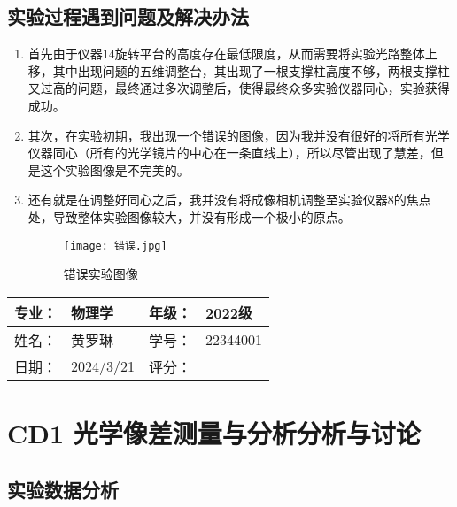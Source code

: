 \documentclass[dvipsnames, svgnames,a4paper,11pt]{article}
\begin{document}
	
	\subsection{实验过程遇到问题及解决办法}
	\begin{enumerate}
		\item 首先由于仪器14旋转平台的高度存在最低限度，从而需要将实验光路整体上移，其中出现问题的五维调整台，其出现了一根支撑柱高度不够，两根支撑柱又过高的问题，最终通过多次调整后，使得最终众多实验仪器同心，实验获得成功。
		\item 其次，在实验初期，我出现一个错误的图像，因为我并没有很好的将所有光学仪器同心（所有的光学镜片的中心在一条直线上），所以尽管出现了慧差，但是这个实验图像是不完美的。
		\item 还有就是在调整好同心之后，我并没有将成像相机调整至实验仪器8的焦点处，导致整体实验图像较大，并没有形成一个极小的原点。
		
		
		
		\begin{figure}[H]
		\centering
		\texttt{[image: 错误.jpg]}
		\caption{错误实验图像}
		\label{错误实验图像}
		\end{figure}
	

	
	\end{enumerate}
	
	
	
	\clearpage
	
	\begin{table}
		\renewcommand\arraystretch{1.7}
		\begin{tabularx}{\textwidth}{|X|X|X|X|}
			\hline
			专业：& 物理学 &年级：& 2022级\\
			\hline
			姓名： &  黄罗琳& 学号：&22344001 \\
			\hline
			日期：& 2024/3/21 & 评分： &   \\
			\hline
		\end{tabularx}
	\end{table}
	
	\section{CD1 光学像差测量与分析\quad\heiti 分析与讨论}
	
	\subsection{实验数据分析}
	
\end{document}
